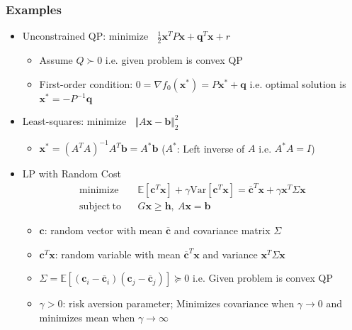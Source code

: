 \subsubsection*{Examples}
\begin{itemize}
    \item Unconstrained QP: $\mathrm{minimize}~~~~\frac 1 2 \mathbf{x}^TP\mathbf{x} + \mathbf{q}^T\mathbf{x} + r$
    \begin{itemize}
        \item Assume $Q \succ 0$ i.e. given problem is convex QP
        \item First-order condition: $0 = \nabla f_0(\mathbf{x}^{\ast}) = P\mathbf{x}^{\ast} + \mathbf{q}$
            i.e. optimal solution is $\mathbf{x}^{\ast} = -P^{-1}\mathbf{q}$
    \end{itemize}
    \item Least-squares: $\mathrm{minimize}~~~~\Vert A\mathbf{x} - \mathbf{b} \Vert_2^2$
    \begin{itemize}
        \item $\mathbf{x}^{\ast} = \left(A^TA\right)^{-1}A^T\mathbf{b} = A^{\ast}\mathbf{b}$ ($A^{\ast}$: Left inverse of $A$ i.e. $A^{\ast}A = I$)
    \end{itemize}
    \item LP with Random Cost
    \begin{equation}\begin{aligned}
        \mathrm{minimize}~~&~~
            \mathbb{E}\left[ \mathbf{c}^T\mathbf{x} \right] + \gamma \mathrm{Var}\left[ \mathbf{c}^T \mathbf{x} \right]
            = \overline{\mathbf{c}}^T\mathbf{x} + \gamma \mathbf{x}^T \Sigma \mathbf{x} \\
        \mathrm{subject~to}~~&~~G\mathbf{x} \geq \mathbf{h},~A\mathbf{x} = \mathbf{b}
    \end{aligned}\end{equation}
    \begin{itemize}
        \item $\mathbf{c}$: random vector with mean $\overline{\mathbf{c}}$ and covariance matrix $\Sigma$
        \item $\mathbf{c}^T\mathbf{x}$: random variable with mean $\overline{\mathbf{c}}^T\mathbf{x}$ and variance $\mathbf{x}^T\Sigma\mathbf{x}$
        \item $\Sigma = \mathbb{E}\left[\left(\mathbf{c}_i - \overline{\mathbf{c}}_i\right)\left(\mathbf{c}_j - \overline{\mathbf{c}}_j\right)\right] \succeq 0$
            i.e. Given problem is convex QP
        \item $\gamma > 0$: risk aversion parameter; Minimizes covariance when $\gamma \rightarrow 0$ and minimizes mean when $\gamma \rightarrow \infty$
    \end{itemize}
\end{itemize}

